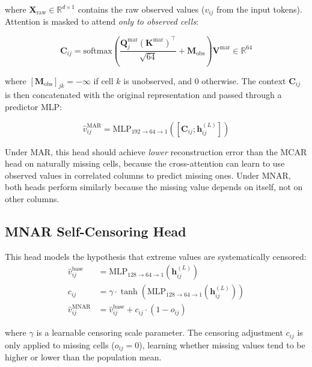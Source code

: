\documentclass[11pt]{article}
\newcommand{\RR}{\mathbb{R}}
\newcommand{\softmax}{\text{softmax}}
\begin{document}
where $\mathbf{X}_{\text{raw}} \in \RR^{d \times 1}$ contains the raw observed values ($v_{ij}$ from the input tokens). Attention is masked to attend \emph{only to observed cells}:

\begin{equation}
\mathbf{C}_{ij} = \softmax\!\left(\frac{\mathbf{Q}^{\text{mar}}_j (\mathbf{K}^{\text{mar}})^\top}{\sqrt{64}} + \mathbf{M}_{\text{obs}}\right) \mathbf{V}^{\text{mar}} \in \RR^{64}
\label{eq:mar_attn}
\end{equation}

where $[\mathbf{M}_{\text{obs}}]_{jk} = -\infty$ if cell $k$ is unobserved, and 0 otherwise. The context $\mathbf{C}_{ij}$ is then concatenated with the original representation and passed through a predictor MLP:

\begin{equation}
\hat{v}^{\text{MAR}}_{ij} = \text{MLP}_{192 \to 64 \to 1}\!\left([\mathbf{C}_{ij}; \mathbf{h}^{(L)}_{ij}]\right)
\label{eq:mar_pred}
\end{equation}

Under MAR, this head should achieve \emph{lower} reconstruction error than the MCAR head on naturally missing cells, because the cross-attention can learn to use observed values in correlated columns to predict missing ones. Under MNAR, both heads perform similarly because the missing value depends on itself, not on other columns.

\subsection{MNAR Self-Censoring Head}

This head models the hypothesis that extreme values are systematically censored:
\begin{align}
\hat{v}^{\text{base}}_{ij} &= \text{MLP}_{128 \to 64 \to 1}\!\left(\mathbf{h}^{(L)}_{ij}\right) \label{eq:mnar_base} \\
c_{ij} &= \gamma \cdot \tanh\!\left(\text{MLP}_{128 \to 64 \to 1}\!\left(\mathbf{h}^{(L)}_{ij}\right)\right) \label{eq:mnar_censor} \\
\hat{v}^{\text{MNAR}}_{ij} &= \hat{v}^{\text{base}}_{ij} + c_{ij} \cdot (1 - o_{ij}) \label{eq:mnar_pred}
\end{align}

where $\gamma$ is a learnable censoring scale parameter. The censoring adjustment $c_{ij}$ is only applied to missing cells ($o_{ij} = 0$), learning whether missing values tend to be higher or lower than the population mean.
\end{document}
